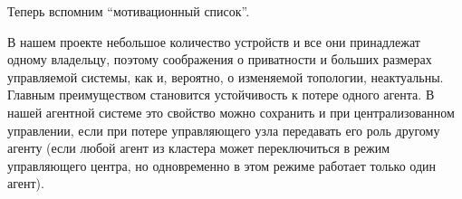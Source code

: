 \documentclass{report}
\begin{document}
\begin{itemize}
    
    
\end{itemize}

Теперь вспомним ``мотивационный список''.

В нашем проекте небольшое количество устройств и все они принадлежат одному владельцу, поэтому соображения о приватности и больших размерах управляемой системы, как и, вероятно, о изменяемой топологии, неактуальны.
Главным преимуществом становится устойчивость к потере одного агента.
В нашей агентной системе это свойство можно сохранить и при централизованном управлении, если при потере управляющего узла передавать его роль другому агенту (если любой агент из кластера может переключиться в режим управляющего центра, но одновременно в этом режиме работает только один агент).
\end{document}
